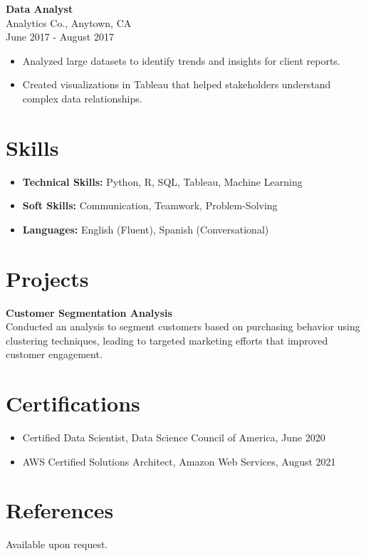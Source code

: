 \documentclass[a4paper,10pt]{article}
\begin{document}
\textbf{Data Analyst} \\
Analytics Co., Anytown, CA \\
June 2017 - August 2017 \\
\begin{itemize}[left=0pt]
    \item Analyzed large datasets to identify trends and insights for client reports.
    \item Created visualizations in Tableau that helped stakeholders understand complex data relationships.
\end{itemize}

\section*{Skills}
\begin{itemize}[left=0pt]
    \item \textbf{Technical Skills:} Python, R, SQL, Tableau, Machine Learning
    \item \textbf{Soft Skills:} Communication, Teamwork, Problem-Solving
    \item \textbf{Languages:} English (Fluent), Spanish (Conversational)
\end{itemize}

\section*{Projects}
\textbf{Customer Segmentation Analysis} \\
Conducted an analysis to segment customers based on purchasing behavior using clustering techniques, leading to targeted marketing efforts that improved customer engagement.

\section*{Certifications}
\begin{itemize}[left=0pt]
    \item Certified Data Scientist, Data Science Council of America, June 2020
    \item AWS Certified Solutions Architect, Amazon Web Services, August 2021
\end{itemize}

\section*{References}
Available upon request.
\end{document}
